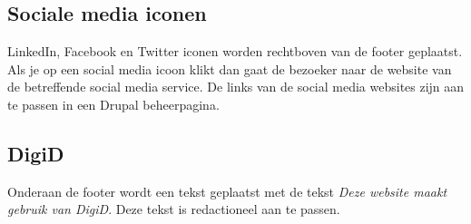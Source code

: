 \subsection{Sociale media iconen}
\label{sec:socialemediaiconen}
LinkedIn, Facebook en Twitter iconen worden rechtboven van de footer geplaatst. Als je op een social media icoon klikt dan gaat de bezoeker naar de website van de betreffende social media service. De links van de social media websites zijn aan te passen in een Drupal beheerpagina.

\subsection{DigiD}
\label{sec:digid}
Onderaan de footer wordt een tekst geplaatst met de tekst \emph{Deze website maakt gebruik van DigiD}. Deze tekst is redactioneel aan te passen.
